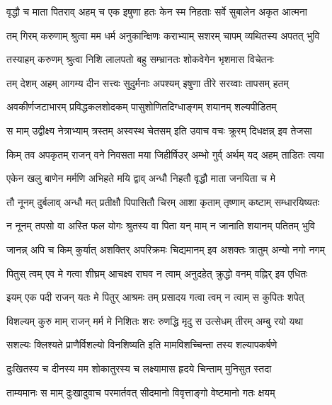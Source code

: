 \twolineshloka
{वृद्धौ च माता पितराव् अहम् च एक इषुणा हतः}
{केन स्म निहताः सर्वे सुबालेन अकृत आत्मना} %

\twolineshloka
{तम् गिरम् करुणाम् श्रुत्वा मम धर्म अनुकान्क्षिणः}
{कराभ्याम् सशरम् चापम् व्यथितस्य अपतत् भुवि} %

\twolineshloka
{तस्याहम् करुणम् श्रुत्वा निशि लालपतो बहु}
{सम्भ्रानतः शोकवेगेन भृशमास विचेतनः} %

\twolineshloka
{तम् देशम् अहम् आगम्य दीन सत्त्वः सुदुर्मनाः}
{अपश्यम् इषुणा तीरे सरय्वाः तापसम् हतम्} %

\twolineshloka
{अवकीर्णजटाभारम् प्रविद्धकलशोदकम्}
{पासुशोणितदिग्धाङ्गम् शयानम् शल्यपीडितम्} %

\twolineshloka
{स माम् उद्वीक्ष्य नेत्राभ्याम् त्रस्तम् अस्वस्थ चेतसम्}
{इति उवाच वचः क्रूरम् दिधक्षन्न् इव तेजसा} %

\twolineshloka
{किम् तव अपकृतम् राजन् वने निवसता मया}
{जिहीर्षिउर् अम्भो गुर्व् अर्थम् यद् अहम् ताडितः त्वया} %

\twolineshloka
{एकेन खलु बाणेन मर्मणि अभिहते मयि}
{द्वाव् अन्धौ निहतौ वृद्धौ माता जनयिता च मे} %

\twolineshloka
{तौ नूनम् दुर्बलाव् अन्धौ मत् प्रतीक्षौ पिपासितौ}
{चिरम् आशा कृताम् तृष्णाम् कष्टाम् सम्धारयिष्यतः} %

\twolineshloka
{न नूनम् तपसो वा अस्ति फल योगः श्रुतस्य वा}
{पिता यन् माम् न जानाति शयानम् पतितम् भुवि} %

\twolineshloka
{जानन्न् अपि च किम् कुर्यात् अशक्तिर् अपरिक्रमः}
{चिद्यमानम् इव अशक्तः त्रातुम् अन्यो नगो नगम्} %

\twolineshloka
{पितुस् त्वम् एव मे गत्वा शीघ्रम् आचक्ष्व राघव}
{न त्वाम् अनुदहेत् क्रुद्धो वनम् वह्निर् इव एधितः} %

\twolineshloka
{इयम् एक पदी राजन् यतः मे पितुर् आश्रमः}
{तम् प्रसादय गत्वा त्वम् न त्वाम् स कुपितः शपेत्} %

\twolineshloka
{विशल्यम् कुरु माम् राजन् मर्म मे निशितः शरः}
{रुणद्धि मृदु स उत्सेधम् तीरम् अम्बु रयो यथा} %

\twolineshloka
{सशल्यः क्लिश्यते प्राणैर्विशल्यो विनशिष्यति}
{इति मामविशच्चिन्ता तस्य शल्यापकर्षणे} %

\twolineshloka
{दुःखितस्य च दीनस्य मम शोकातुरस्य च}
{लक्ष्यामास हृदये चिन्ताम् मुनिसुत स्तदा} %

\twolineshloka
{ताम्यमानः स माम् दुःखादुवाच परमार्तवत्}
{सीदमानो विवृत्ताङ्गो वेष्टमानो गतः क्षयम्} %

